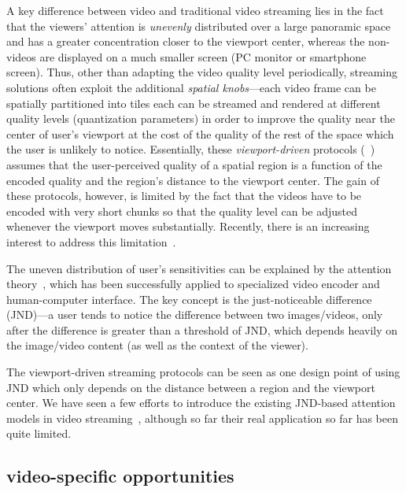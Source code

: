 A key difference between \vr video and traditional video streaming lies in the fact that the \vr viewers' attention is {\em unevenly} distributed over a large panoramic space and has a greater concentration closer to the viewport center, whereas the non-\vr videos are displayed on a much smaller screen (PC monitor or smartphone screen).
Thus, other than adapting the video quality level periodically, \vr streaming solutions often exploit the additional {\em spatial knobs}---each video frame can be spatially partitioned into tiles each can be streamed and rendered at different quality levels (\eg quantization parameters) in order to improve the quality near the center of user's viewport at the cost of the quality of the rest of the space which the user is unlikely to notice. 
Essentially, these {\em viewport-driven} protocols (\eg~\cite{??,??,??}) assumes that the user-perceived quality of a spatial region is a function of the encoded quality and the region's distance to the viewport center.
The gain of these protocols, however, is limited by the fact that the videos have to be encoded with very short chunks so that the quality level can be adjusted whenever the viewport moves substantially. 
Recently, there is an increasing interest to address this limitation~\cite{??,??,??}.


The uneven distribution of \vr user's sensitivities can be explained by the attention theory~\cite{??,??}, which has been successfully applied to specialized video encoder and human-computer interface. 
The key concept is the just-noticeable difference (JND)---a user tends to notice the difference between two images/videos, only after the difference is greater than a threshold of JND, which depends heavily on the image/video content (as well as the context of the viewer).

The viewport-driven streaming protocols can be seen as one design point of using JND which only depends on the distance between a region and the viewport center. 
We have seen a few efforts to introduce the existing JND-based attention models in video streaming~\cite{??,??}, although so far their real application so far has been quite limited.

\subsection{\vr video-specific opportunities}

